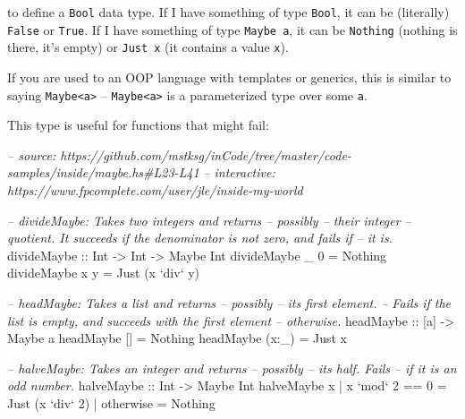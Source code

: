 \documentclass[]{article}
\newenvironment{Shaded}{}{}
\newcommand{\CommentTok}[1]{\textcolor[rgb]{0.38,0.63,0.69}{\textit{#1}}}
\newcommand{\DataTypeTok}[1]{\textcolor[rgb]{0.56,0.13,0.00}{#1}}
\newcommand{\DecValTok}[1]{\textcolor[rgb]{0.25,0.63,0.44}{#1}}
\newcommand{\FunctionTok}[1]{\textcolor[rgb]{0.02,0.16,0.49}{#1}}
\newcommand{\NormalTok}[1]{#1}
\newcommand{\OtherTok}[1]{\textcolor[rgb]{0.00,0.44,0.13}{#1}}
\begin{document}
to define a \texttt{Bool} data type. If I have something of type \texttt{Bool},
it can be (literally) \texttt{False} or \texttt{True}. If I have something of
type \texttt{Maybe\ a}, it can be \texttt{Nothing} (nothing is there, it's
empty) or \texttt{Just\ x} (it contains a value \texttt{x}).

If you are used to an OOP language with templates or generics, this is similar
to saying \texttt{Maybe\textless{}a\textgreater{}} --
\texttt{Maybe\textless{}a\textgreater{}} is a parameterized type over some
\texttt{a}.

This type is useful for functions that might fail:

\begin{Shaded}
\begin{Highlighting}[]
\CommentTok{-- source: https://github.com/mstksg/inCode/tree/master/code-samples/inside/maybe.hs#L23-L41}
\CommentTok{-- interactive: https://www.fpcomplete.com/user/jle/inside-my-world}

\CommentTok{-- divideMaybe: Takes two integers and returns -- possibly -- their integer}
\CommentTok{--      quotient. It succeeds if the denominator is not zero, and fails if}
\CommentTok{--      it is.}
\OtherTok{divideMaybe ::} \DataTypeTok{Int} \OtherTok{->} \DataTypeTok{Int} \OtherTok{->} \DataTypeTok{Maybe} \DataTypeTok{Int}
\NormalTok{divideMaybe _ }\DecValTok{0} \FunctionTok{=} \DataTypeTok{Nothing}
\NormalTok{divideMaybe x y }\FunctionTok{=} \DataTypeTok{Just}\NormalTok{ (x }\OtherTok{`div`}\NormalTok{ y)}

\CommentTok{-- headMaybe: Takes a list and returns -- possibly -- its first element.}
\CommentTok{--      Fails if the list is empty, and succeeds with the first element}
\CommentTok{--      otherwise.}
\OtherTok{headMaybe ::}\NormalTok{ [a] }\OtherTok{->} \DataTypeTok{Maybe}\NormalTok{ a}
\NormalTok{headMaybe []    }\FunctionTok{=} \DataTypeTok{Nothing}
\NormalTok{headMaybe (x}\FunctionTok{:}\NormalTok{_) }\FunctionTok{=} \DataTypeTok{Just}\NormalTok{ x}

\CommentTok{-- halveMaybe: Takes an integer and returns -- possibly -- its half.  Fails}
\CommentTok{--      if it is an odd number.}
\OtherTok{halveMaybe ::} \DataTypeTok{Int} \OtherTok{->} \DataTypeTok{Maybe} \DataTypeTok{Int}
\NormalTok{halveMaybe x }\FunctionTok{|}\NormalTok{ x }\OtherTok{`mod`} \DecValTok{2} \FunctionTok{==} \DecValTok{0} \FunctionTok{=} \DataTypeTok{Just}\NormalTok{ (x }\OtherTok{`div`} \DecValTok{2}\NormalTok{)}
             \FunctionTok{|}\NormalTok{ otherwise      }\FunctionTok{=} \DataTypeTok{Nothing}
\end{Highlighting}
\end{Shaded}
\end{document}
